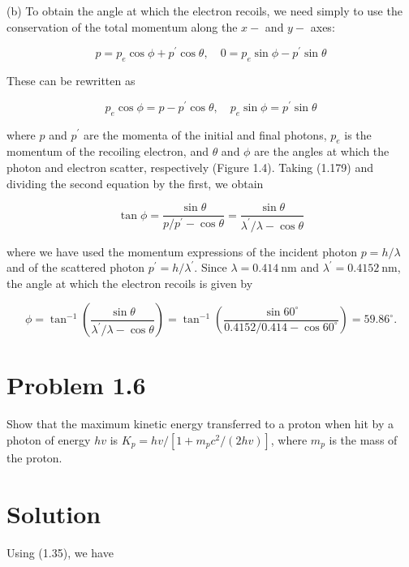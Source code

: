 \documentclass[10pt]{article}
\begin{document}
(b) To obtain the angle at which the electron recoils, we need simply to use the conservation of the total momentum along the $x-$ and $y-$ axes:


\begin{equation*}
p=p_{e} \cos \phi+p^{\prime} \cos \theta, \quad 0=p_{e} \sin \phi-p^{\prime} \sin \theta \tag{1.178}
\end{equation*}


These can be rewritten as


\begin{equation*}
p_{e} \cos \phi=p-p^{\prime} \cos \theta, \quad p_{e} \sin \phi=p^{\prime} \sin \theta \tag{1.179}
\end{equation*}


where $p$ and $p^{\prime}$ are the momenta of the initial and final photons, $p_{e}$ is the momentum of the recoiling electron, and $\theta$ and $\phi$ are the angles at which the photon and electron scatter, respectively (Figure 1.4). Taking (1.179) and dividing the second equation by the first, we obtain


\begin{equation*}
\tan \phi=\frac{\sin \theta}{p / p^{\prime}-\cos \theta}=\frac{\sin \theta}{\lambda^{\prime} / \lambda-\cos \theta} \tag{1.180}
\end{equation*}


where we have used the momentum expressions of the incident photon $p=h / \lambda$ and of the scattered photon $p^{\prime}=h / \lambda^{\prime}$. Since $\lambda=0.414 \mathrm{~nm}$ and $\lambda^{\prime}=0.4152 \mathrm{~nm}$, the angle at which the electron recoils is given by


\begin{equation*}
\phi=\tan ^{-1}\left(\frac{\sin \theta}{\lambda^{\prime} / \lambda-\cos \theta}\right)=\tan ^{-1}\left(\frac{\sin 60^{\circ}}{0.4152 / 0.414-\cos 60^{\circ}}\right)=59.86^{\circ} . \tag{1.181}
\end{equation*}


\section*{Problem 1.6}
Show that the maximum kinetic energy transferred to a proton when hit by a photon of energy $h v$ is $K_{p}=h v /\left[1+m_{p} c^{2} /(2 h v)\right]$, where $m_{p}$ is the mass of the proton.

\section*{Solution}
Using (1.35), we have
\end{document}
